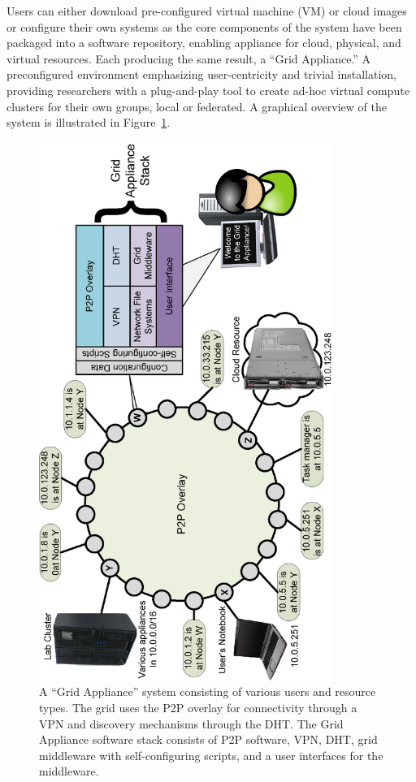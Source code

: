 \documentclass[conference]{IEEEtran}
\begin{document}
Users can either download pre-configured virtual machine (VM) or cloud images
or configure their own systems as the core components of the system have been
packaged into a software repository, enabling appliance for cloud, physical,
and virtual resources.  Each producing the same result, a ``Grid Appliance.'' A
preconfigured environment emphasizing user-centricity and trivial installation,
providing researchers with a plug-and-play tool to create ad-hoc virtual
compute clusters for their own groups, local or federated.  A graphical
overview of the system is illustrated in Figure~\ref{fig:appliance}.

\begin{figure}[ht]
\centering
\includegraphics[width=3.75in,angle=-90]{figs/appliance_overlays.eps}
\caption{A ``Grid Appliance'' system consisting of various users and resource
types.  The grid uses the P2P overlay for connectivity through a VPN and
discovery mechanisms through the DHT.  The Grid Appliance software stack
consists of P2P software, VPN, DHT, grid middleware with self-configuring
scripts, and a user interfaces for the middleware.}
\label{fig:appliance}
\end{figure}
\end{document}
